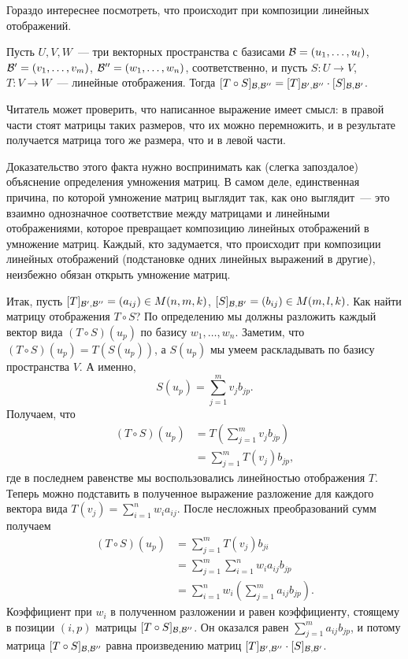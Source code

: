 Гораздо интереснее посмотреть, что
происходит при композиции линейных отображений.
\begin{theorem}\label{thm:composition-is-multiplication}
Пусть $U,V,W$~--- три векторных пространства с базисами
$\mathcal B = (u_1,\dots,u_l)$,
$\mathcal B' = (v_1,\dots,v_m)$,
$\mathcal B'' = (w_1,\dots,w_n)$, соответственно,
и пусть $S\colon U\to V$, $T\colon V\to W$~--- линейные отображения.
Тогда
$[T\circ S]_{\mathcal B,\mathcal B''} = [T]_{\mathcal B',\mathcal B''}\cdot
[S]_{\mathcal B,\mathcal B'}$.
\end{theorem}
Читатель может проверить, что написанное выражение имеет смысл:
в правой части стоят матрицы таких размеров, что их можно
перемножить, и в результате получается матрица того же размера,
что и в левой части.

Доказательство этого факта нужно воспринимать как
(слегка запоздалое) объяснение определения умножения матриц.
В самом деле, единственная причина, по которой умножение
матриц выглядит так, как оно выглядит~--- это взаимно
однозначное соответствие между матрицами и линейными отображениями,
которое превращает композицию линейных отображений
в умножение матриц. Каждый, кто задумается, что происходит
при композиции линейных отображений (подстановке одних линейных
выражений в другие), неизбежно обязан открыть умножение матриц.

Итак, пусть $[T]_{\mathcal B',\mathcal B''} = (a_{ij}) \in M(n,m,k)$,
$[S]_{\mathcal B,\mathcal B'} = (b_{ij}) \in M(m,l,k)$.
Как найти матрицу отображения $T\circ S$?
По определению мы должны разложить каждый вектор
вида $(T\circ S)(u_p)$ по базису $w_1,\dots,w_n$.
Заметим, что  $(T\circ S)(u_p) = T(S(u_p))$,
а $S(u_p)$ мы умеем раскладывать по базису пространства $V$.
А именно,
$$
S(u_p) = \sum_{j=1}^m v_jb_{jp}.
$$
Получаем, что
\begin{align*}
(T\circ S)(u_p) &= T\left(\sum_{j=1}^m v_jb_{jp}\right)\\
&= \sum_{j=1}^m T(v_j)b_{jp},
\end{align*}
где в последнем равенстве мы воспользовались линейностью
отображения $T$. Теперь можно подставить в полученное
выражение разложение для каждого вектора вида
$T(v_j) = \sum_{i=1}^n w_i a_{ij}$.
После несложных преобразований сумм получаем
\begin{align*}
(T\circ S)(u_p) &=  \sum_{j=1}^m T(v_j)b_{ji} \\
&= \sum_{j=1}^m \sum_{i=1}^n w_i a_{ij} b_{jp} \\
&= \sum_{i=1}^n w_i\left( \sum_{j=1}^m a_{ij}b_{jp}\right).
\end{align*}
Коэффициент при $w_i$ в полученном разложении и равен
коэффициенту, стоящему в позиции $(i,p)$ матрицы
$[T\circ S]_{\mathcal B,\mathcal B''}$.
Он оказался равен $\sum_{j=1}^m a_{ij}b_{jp}$,
и потому матрица $[T\circ S]_{\mathcal B,\mathcal B''}$ равна
произведению матриц
$[T]_{\mathcal B',\mathcal B''}\cdot [S]_{\mathcal B,\mathcal B'}$.

